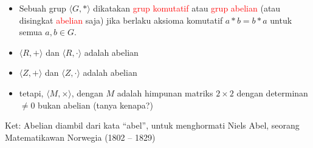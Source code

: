\documentclass{article}
\begin{document}

\begin{itemize}
    \item Sebuah grup $\langle G, *\rangle$ dikatakan \textcolor{red}{grup komutatif} atau \textcolor{red}{grup abelian} (atau disingkat \textcolor{red}{abelian} saja) jika berlaku aksioma komutatif $a * b = b * a$ untuk semua $a, b \in G$.
    \item $\langle R, +\rangle$ dan $\langle R, \cdot\rangle$ adalah abelian
    \item $\langle Z, +\rangle$ dan $\langle Z, \cdot\rangle$ adalah abelian
    \item tetapi, $\langle M, \times\rangle$, dengan $M$ adalah himpunan matriks $2 \times 2$ dengan determinan $\neq 0$ bukan abelian (tanya kenapa?)
\end{itemize}

\vspace{10mm}

Ket: Abelian diambil dari kata ``abel'', untuk menghormati Niels Abel, seorang Matematikawan Norwegia (1802 -- 1829)
\end{document}
